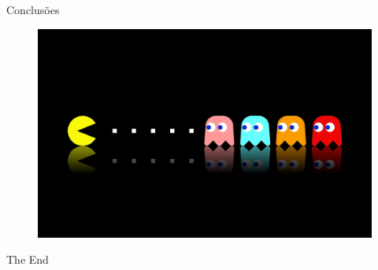 \documentclass{beamer}
\begin{document}

\begin{frame}
\Huge{\centerline{Conclusões}}
\begin{figure}[h]
    \centering
    \includegraphics[width=0.7\linewidth]{images/pacman_conclusion}
\end{figure}
\end{frame}


\begin{frame}


\end{frame}

\begin{frame}
\Huge{\centerline{The End}}
\end{frame}


\end{document}
